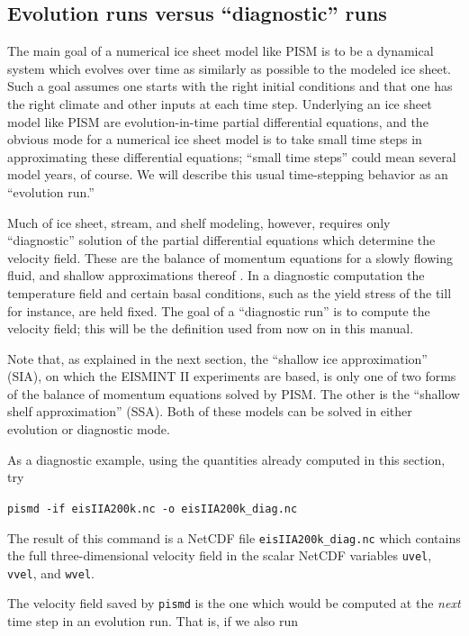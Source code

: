 \documentclass[11pt,final]{amsart}
\begin{document}
\subsection{Evolution runs versus ``diagnostic'' runs}  The main goal of a numerical ice sheet model like PISM is to be a dynamical system which evolves over time as similarly as possible to the modeled ice sheet.  Such a goal assumes one starts with the right initial conditions and that one has the right climate and other inputs at each time step.  Underlying an ice sheet model like PISM are evolution-in-time partial differential equations, and the obvious mode for a numerical ice sheet model is to take small time steps in approximating these differential equations; ``small time steps'' could mean several model years, of course.  We will describe this usual time-stepping behavior as an ``evolution run.''

Much of ice sheet, stream, and shelf modeling, however, requires only ``diagnostic'' solution of the partial differential equations which determine the velocity field.  These are the balance of momentum equations for a slowly flowing fluid, and shallow approximations thereof \cite{Fowler}.  In a diagnostic computation the temperature field and certain basal conditions, such as the yield stress of the till for instance, are held fixed.  The goal of a ``diagnostic run'' is to compute the velocity field; this will be the definition used from now on in this manual.

Note that, as explained in the next section, the ``shallow ice approximation'' (SIA), on which the EISMINT II experiments are based, is only one of two forms of the balance of momentum equations solved by PISM.  The other is the ``shallow shelf approximation'' (SSA).  Both of these models can be solved in either evolution or diagnostic mode.

As a diagnostic example, using the quantities already computed in this section, try

\verb|pismd -if eisIIA200k.nc -o eisIIA200k_diag.nc|

\noindent The result of this command is a NetCDF file \verb|eisIIA200k_diag.nc| which contains the full three-dimensional velocity field in the scalar NetCDF variables \verb|uvel|, \verb|vvel|, and \verb|wvel|.

The velocity field saved by \verb|pismd| is the one which would be computed at the \emph{next} time step in an evolution run.  That is, if we also run
\end{document}
